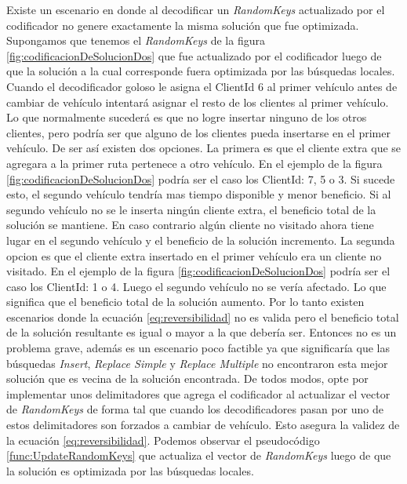 Existe un escenario en donde al decodificar un \textit{RandomKeys} actualizado por el codificador no genere exactamente la misma solución que fue optimizada. Supongamos que tenemos el \textit{RandomKeys} de la figura \ref{fig:codificacionDeSolucionDos} que fue actualizado por el codificador luego de que la solución a la cual corresponde fuera optimizada por las búsquedas locales. Cuando el decodificador goloso le asigna el ClientId 6 al primer vehículo antes de cambiar de vehículo intentará asignar el resto de los clientes al primer vehículo. Lo que normalmente sucederá es que no logre insertar ninguno de los otros clientes, pero podría ser que alguno de los clientes pueda insertarse en el primer vehículo. De ser así existen dos opciones. La primera es que el cliente extra que se agregara a la primer ruta pertenece a otro vehículo. En el ejemplo de la figura \ref{fig:codificacionDeSolucionDos} podría ser el caso los ClientId: 7, 5 o 3. Si sucede esto, el segundo vehículo tendría mas tiempo disponible y menor beneficio. Si al segundo vehículo no se le inserta ningún cliente extra, el beneficio total de la solución se mantiene. En caso contrario algún cliente no visitado ahora tiene lugar en el segundo vehículo y el beneficio de la solución incremento. La segunda opcion es que el cliente extra insertado en el primer vehículo era un cliente no visitado. En el ejemplo de la figura \ref{fig:codificacionDeSolucionDos} podría ser el caso los ClientId: 1 o 4. Luego el segundo vehículo no se vería afectado. Lo que significa que el beneficio total de la solución aumento. Por lo tanto existen escenarios donde la ecuación \ref{eq:reversibilidad} no es valida pero el beneficio total de la solución resultante es igual o mayor a la que debería ser. Entonces no es un problema grave, además es un escenario poco factible ya que significaría que las búsquedas \textit{Insert}, \textit{Replace Simple} y \textit{Replace Multiple} no encontraron esta mejor solución que es vecina de la solución encontrada. De todos modos, opte por implementar unos delimitadores que agrega el codificador al actualizar el vector de \textit{RandomKeys} de forma tal que cuando los decodificadores pasan por uno de estos delimitadores son forzados a cambiar de vehículo. Esto asegura la validez de la ecuación \ref{eq:reversibilidad}. Podemos observar el pseudocódigo \ref{func:UpdateRandomKeys} que actualiza el vector de \textit{RandomKeys} luego de que la solución es optimizada por las búsquedas locales.

\bigskip

